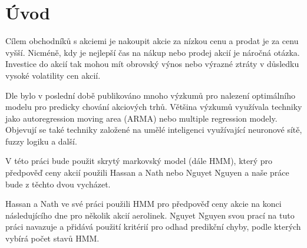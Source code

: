 \section{Úvod}

Cílem obchodníků s akciemi je nakoupit akcie za nízkou cenu a prodat je za cenu vyšší. Nicméně,
kdy je nejlepší čas na nákup nebo prodej akcií je náročná otázka. Investice do akcií tak mohou mít
obrovský výnos nebo výrazné ztráty v důsledku vysoké volatility cen akcií.

Dle \cite{Hassan} bylo v poslední době publikováno mnoho výzkumů pro nalezení optimálního modelu
pro predicky chování akciových trhů. Většina výzkumů využívala techniky jako autoregression moving area (ARMA) nebo multiple regression modely.
Objevují se také techniky založené na umělé inteligenci využívající neuronové sítě, fuzzy logiku a další.

V této práci bude použit skrytý markovský model (dále HMM), který pro předpověď ceny akcií použili Hassan a Nath \cite{Hassan} nebo Nguyet Nguyen \cite{Nguyen} a naše práce bude z těchto dvou vycházet.

Hassan a Nath ve své práci \cite{Hassan} použili HMM pro předpověď ceny akcie na konci následujícího dne pro několik akcií aerolinek. Nguyet Nguyen svou prací \cite{Nguyen} na tuto práci navazuje a přidává použití kritérií pro odhad predikční chyby, podle kterých vybírá počet stavů HMM.

\clearpage
